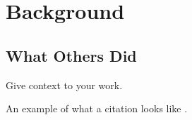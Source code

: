 \chapter{Background}
\label{chapter:background}

\section{What Others Did}

Give context to your work.

An example of what a citation looks like \citet{example_entry}.
